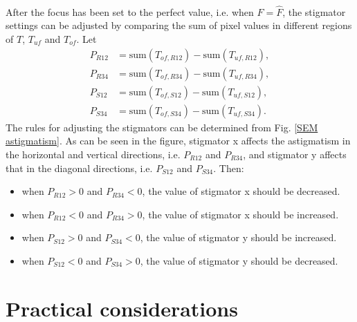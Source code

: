 \documentclass[12pt, twocolumn]{report}
\begin{document}
\paragraph{}
After the focus has been set to the perfect value, i.e. when $F=\hat{F}$, the stigmator settings can be adjusted by comparing the sum of pixel values in different regions of $T$, $T_{uf}$ and $T_{of}$. Let
\begin{align}
    P_{R12} & = \text{sum}(T_{of,R12}) - \text{sum}(T_{uf,R12}), \\
    P_{R34} & = \text{sum}(T_{of,R34}) - \text{sum}(T_{uf,R34}), \\
    P_{S12} & = \text{sum}(T_{of,S12}) - \text{sum}(T_{uf,S12}), \\
    P_{S34} & = \text{sum}(T_{of,S34}) - \text{sum}(T_{uf,S34}).
\end{align}
The rules for adjusting the stigmators can be determined from Fig. \ref{SEM astigmatism}. As can be seen in the figure, stigmator x affects the astigmatism in the horizontal and vertical directions, i.e. $P_{R12}$ and $P_{R34}$, and stigmator y affects that in the diagonal directions, i.e. $P_{S12}$ and ${P_{S34}}$. Then:
\begin{itemize}
    \item when $P_{R12}>0$ and $P_{R34}<0$, the value of stigmator x should be decreased.
    \item when $P_{R12}<0$ and $P_{R34}>0$, the value of stigmator x should be increased.
    \item when $P_{S12}>0$ and $P_{S34}<0$, the value of stigmator y should be increased.
    \item when $P_{S12}<0$ and $P_{S34}>0$, the value of stigmator y should be decreased.
\end{itemize}

\section{Practical considerations}
\end{document}
